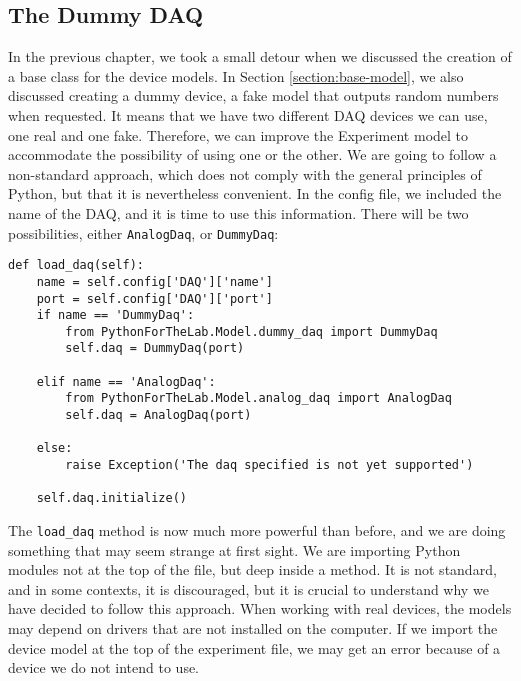
\subsection{The Dummy DAQ}\label{subsection:loading-dummy-daq}
In the previous chapter, we took a small detour when we discussed the creation of a base class for the device models. In Section \ref{section:base-model}, we also discussed creating a dummy device, a fake model that outputs random numbers when requested. It means that we have two different DAQ devices we can use, one real and one fake. Therefore, we can improve the Experiment model to accommodate the possibility of using one or the other. We are going to follow a non-standard approach, which does not comply with the general principles of Python, but that it is nevertheless convenient. In the config file, we included the name of the DAQ, and it is time to use this information. There will be two possibilities, either \texttt{AnalogDaq}, or \texttt{DummyDaq}:

\begin{verbatim}
def load_daq(self):
    name = self.config['DAQ']['name']
    port = self.config['DAQ']['port']
    if name == 'DummyDaq':
        from PythonForTheLab.Model.dummy_daq import DummyDaq
        self.daq = DummyDaq(port)

    elif name == 'AnalogDaq':
        from PythonForTheLab.Model.analog_daq import AnalogDaq
        self.daq = AnalogDaq(port)

    else:
        raise Exception('The daq specified is not yet supported')

    self.daq.initialize()
\end{verbatim}

The \texttt{load\_daq} method is now much more powerful than before, and we are doing something that may seem strange at first sight. We are importing Python modules not at the top of the file, but deep inside a method. It is not standard, and in some contexts, it is discouraged, but it is crucial to understand why we have decided to follow this approach. When working with real devices, the models may depend on drivers that are not installed on the computer. If we import the device model at the top of the experiment file, we may get an error because of a device we do not intend to use.

